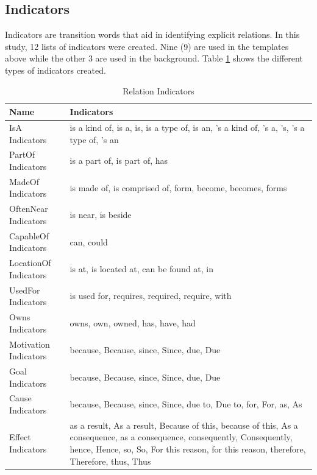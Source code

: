 \subsection{Indicators}
\label{sec:indicators}

Indicators are transition words that aid in identifying explicit relations. In this study, 12 lists of indicators were created. Nine (9) are used in the templates above while the other 3 are used in the background. Table \ref{tab:indicators} shows the different types of indicators created.

\begin{table}[H]   %
\centering
\caption{Relation Indicators} \vspace{0.25em}
\begin{tabular}{|p{3.5cm}|p{10cm}|} \hline
\textbf{Name} & \textbf{Indicators} \\ \hline
IsA Indicators				& is a kind of, is a, is, is a type of, is an, 's a kind of, 's a, 's, 's a type of, 's an \\ \hline
PartOf Indicators			& is a part of, is part of, has \\ \hline
MadeOf Indicators			& is made of, is comprised of, form, become, becomes, forms \\ \hline
OftenNear Indicators		& is near, is beside \\ \hline
CapableOf Indicators		& can, could \\ \hline
LocationOf Indicators		& is at, is located at, can be found at, in \\ \hline
UsedFor Indicators			& is used for, requires, required, require, with \\ \hline
Owns Indicators 			& owns, own, owned, has, have, had \\ \hline
Motivation Indicators		& because, Because, since, Since, due, Due \\ \hline
Goal Indicators				& because, Because, since, Since, due, Due \\ \hline
Cause Indicators			& because, Because, since, Since, due to, Due to, for, For, as, As \\ \hline
Effect Indicators			& as a result, As a result, Because of this, because of this, As a consequence, as a consequence, consequently, Consequently, hence, Hence, so, So, For this reason, for this reason, therefore, Therefore, thus, Thus \\ \hline
\end{tabular}
\label{tab:indicators}
\end{table}

